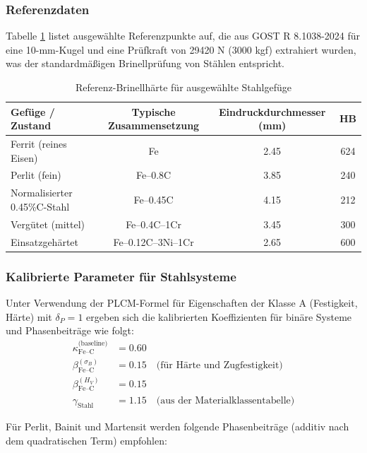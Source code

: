 \documentclass[12pt,a4paper]{article}
\begin{document}
	\subsubsection{Referenzdaten}
	Tabelle \ref{tab:steel_reference} listet ausgewählte Referenzpunkte auf, die aus GOST R 8.1038-2024 für eine 10-mm-Kugel und eine Prüfkraft von 29420 N (3000 kgf) extrahiert wurden, was der standardmäßigen Brinellprüfung von Stählen entspricht.
	
	\begin{table}[htbp]
		\centering
		\caption{Referenz-Brinellhärte für ausgewählte Stahlgefüge}
		\label{tab:steel_reference}
		\begin{tabular}{lccc}
			\toprule
			\textbf{Gefüge / Zustand} & \textbf{Typische Zusammensetzung} & \textbf{Eindruckdurchmesser (mm)} & \textbf{HB} \\
			\midrule
			Ferrit (reines Eisen) & Fe & 2.45 & 624 \\
			Perlit (fein) & Fe–0.8C & 3.85 & 240 \\
			Normalisierter 0.45\%C-Stahl & Fe–0.45C & 4.15 & 212 \\
			Vergütet (mittel) & Fe–0.4C–1Cr & 3.45 & 300 \\
			Einsatzgehärtet & Fe–0.12C–3Ni–1Cr & 2.65 & 600 \\
			\bottomrule
		\end{tabular}
	\end{table}
	
	\subsubsection{Kalibrierte Parameter für Stahlsysteme}
	
	Unter Verwendung der PLCM-Formel für Eigenschaften der Klasse A (Festigkeit, Härte) mit $\delta_P = 1$ ergeben sich die kalibrierten Koeffizienten für binäre Systeme und Phasenbeiträge wie folgt:
	\begin{align*}
		\kappa_{\text{Fe–C}}^{\text{(baseline)}} &= 0.60 \\
		\beta_{\text{Fe–C}}^{(\sigma_B)} &= 0.15 \quad \text{(für Härte und Zugfestigkeit)} \\
		\beta_{\text{Fe–C}}^{(H_V)} &= 0.15 \\
		\gamma_{\text{Stahl}} &= 1.15 \quad \text{(aus der Materialklassentabelle)}
	\end{align*}
	
	Für Perlit, Bainit und Martensit werden folgende Phasenbeiträge (additiv nach dem quadratischen Term) empfohlen:
	
\end{document}
